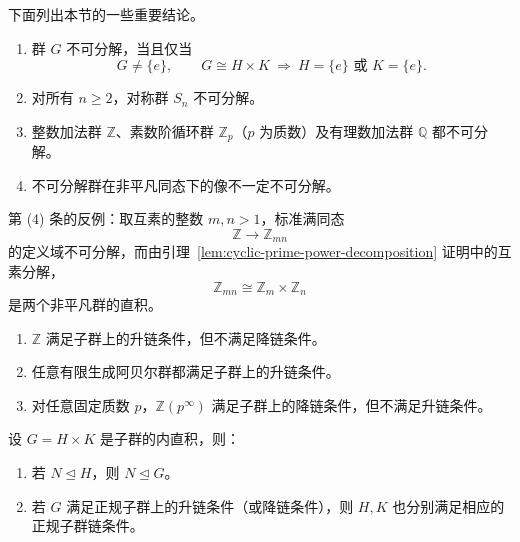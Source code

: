 下面列出本节的一些重要结论。

\begin{proposition}\label{prop:indecomposable-group-examples}
\begin{enumerate}[label=(\arabic*)]
  \item 群 $G$ 不可分解，当且仅当
  \[
    G\ne\{e\},\qquad
    G\cong H\times K\ \Longrightarrow\
    H=\{e\}\text{ 或 }K=\{e\}.
  \]
  \item 对所有 $n\geq2$，对称群 $S_n$ 不可分解。
  \item 整数加法群 $\mathbb Z$、素数阶循环群 $\mathbb Z_p$（$p$ 为质数）及有理数加法群 $\mathbb Q$ 都不可分解。
  \item 不可分解群在非平凡同态下的像不一定不可分解。
\end{enumerate}
\end{proposition}

\begin{purplenote}
第 (4) 条的反例：取互素的整数 $m,n>1$，标准满同态
\[
  \mathbb Z\longrightarrow\mathbb Z_{mn}
\]
的定义域不可分解，而由引理~\ref{lem:cyclic-prime-power-decomposition} 证明中的互素分解，
\[
  \mathbb Z_{mn}\cong\mathbb Z_m\times\mathbb Z_n
\]
是两个非平凡群的直积。
\end{purplenote}

\begin{proposition}\label{prop:abelian-subgroup-chain-conditions}
\begin{enumerate}[label=(\arabic*)]
  \item $\mathbb Z$ 满足子群上的升链条件，但不满足降链条件。
  \item 任意有限生成阿贝尔群都满足子群上的升链条件。
  \item 对任意固定质数 $p$，$\mathbb Z(p^\infty)$ 满足子群上的降链条件，但不满足升链条件。
\end{enumerate}
\end{proposition}

\begin{theorem}\label{thm:normal-chains-in-direct-factors}
设 $G=H\times K$ 是子群的内直积，则：
\begin{enumerate}[label=(\arabic*)]
  \item 若 $N\trianglelefteq H$，则 $N\trianglelefteq G$。
  \item 若 $G$ 满足正规子群上的升链条件（或降链条件），则 $H,K$ 也分别满足相应的正规子群链条件。
\end{enumerate}
\end{theorem}

